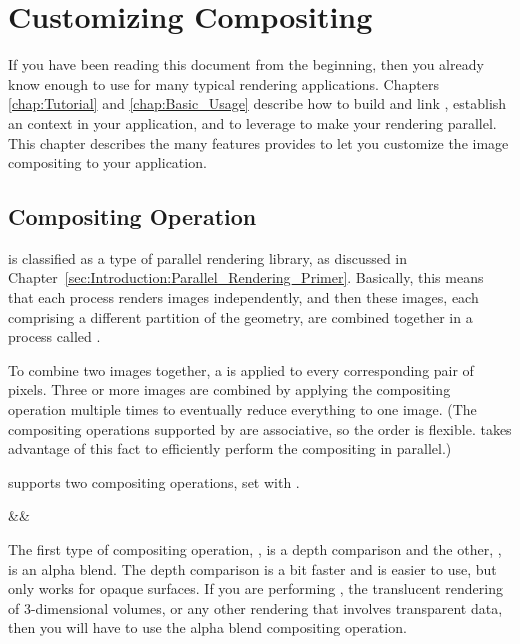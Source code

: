 
\chapter{Customizing Compositing}
\label{chap:Customizing_Compositing}

If you have been reading this document from the beginning, then you already
know enough to use \IceT for many typical rendering applications.  Chapters
\ref{chap:Tutorial} and \ref{chap:Basic_Usage} describe how to build and
link \IceT, establish an \IceT context in your application, and to leverage
\IceT to make your rendering parallel.  This chapter describes the many
features \IceT provides to let you customize the image compositing to your
application.

\section{Compositing Operation}
\label{sec:Customizing_Compositing:Compositing_Operation}

\IceT is classified as a  type of
parallel rendering library, as discussed in
Chapter~\ref{sec:Introduction:Parallel_Rendering_Primer}.  Basically, this
means that each process renders images independently, and then these
images, each comprising a different partition of the geometry, are combined
together in a process called .

To combine two images together, a  is
applied to every corresponding pair of pixels.  Three or more images are
combined by applying the compositing operation multiple times to eventually
reduce everything to one image.  (The compositing operations supported by
\IceT are associative, so the order is flexible.  \IceT takes advantage of
this fact to efficiently perform the compositing in parallel.)

\IceT supports two compositing operations, set with
.

\begin{Table}{3}
  \textC{(}&&\quad\textC{);}
\end{Table}

The first type of compositing operation,
, is a depth comparison and the
other, , is an alpha blend.  The depth
comparison is a bit faster and is easier to use, but only works for opaque
surfaces.  If you are performing , the translucent rendering of 3-dimensional volumes, or any
other rendering that involves transparent data, then you will have to use
the alpha blend compositing operation.

